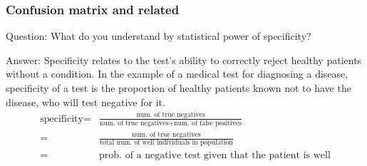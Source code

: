 \documentclass[11pt]{beamer}
\begin{document}
\begin{frame}
\frametitle{Confusion matrix and related}
\begin{block}{Question:}
	What do you understand by statistical power of  specificity?
\end{block}
\begin{block}{Answer:}
	Specificity relates to the test's ability to correctly reject healthy patients without a condition. In the example of a medical test for diagnosing a disease, specificity of a test is the proportion of healthy patients known not to have the disease, who will test negative for it.
	\begin{align*}
	\text{specificity}=&\frac{\text{num. of true negatives}}{\text{num. of true negatives} +\text{num. of false positives}}\\
	=&\frac{\text{num. of true negatives}}{\text{total num. of well individuals in population}}\\
	=& \text{prob. of a negative test given that the patient is well}
	\end{align*}
	
\end{block}
\end{frame}
\end{document}
